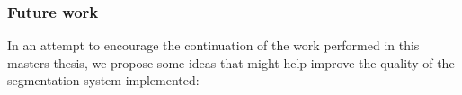
\subsubsection{Future work}
In an attempt to encourage the continuation of the work performed in this masters thesis, we propose some ideas that might help improve the quality of the segmentation system implemented:


